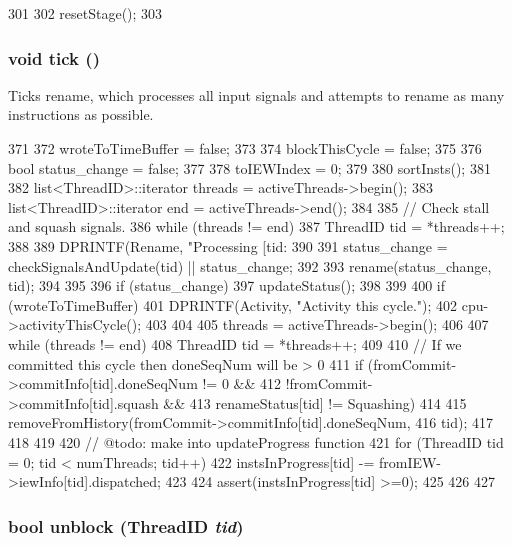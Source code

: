 \begin{DoxyCode}
301 {
302     resetStage();
303 }
\end{DoxyCode}
\hypertarget{classDefaultRename_a873dd91783f9efb4a590aded1f70d6b0}{
\subsubsection[{tick}]{\setlength{\rightskip}{0pt plus 5cm}void tick ()}}
\label{classDefaultRename_a873dd91783f9efb4a590aded1f70d6b0}
Ticks rename, which processes all input signals and attempts to rename as many instructions as possible. 


\begin{DoxyCode}
371 {
372     wroteToTimeBuffer = false;
373 
374     blockThisCycle = false;
375 
376     bool status_change = false;
377 
378     toIEWIndex = 0;
379 
380     sortInsts();
381 
382     list<ThreadID>::iterator threads = activeThreads->begin();
383     list<ThreadID>::iterator end = activeThreads->end();
384 
385     // Check stall and squash signals.
386     while (threads != end) {
387         ThreadID tid = *threads++;
388 
389         DPRINTF(Rename, "Processing [tid:%
390 
391         status_change = checkSignalsAndUpdate(tid) || status_change;
392 
393         rename(status_change, tid);
394     }
395 
396     if (status_change) {
397         updateStatus();
398     }
399 
400     if (wroteToTimeBuffer) {
401         DPRINTF(Activity, "Activity this cycle.\n");
402         cpu->activityThisCycle();
403     }
404 
405     threads = activeThreads->begin();
406 
407     while (threads != end) {
408         ThreadID tid = *threads++;
409 
410         // If we committed this cycle then doneSeqNum will be > 0
411         if (fromCommit->commitInfo[tid].doneSeqNum != 0 &&
412             !fromCommit->commitInfo[tid].squash &&
413             renameStatus[tid] != Squashing) {
414 
415             removeFromHistory(fromCommit->commitInfo[tid].doneSeqNum,
416                                   tid);
417         }
418     }
419 
420     // @todo: make into updateProgress function
421     for (ThreadID tid = 0; tid < numThreads; tid++) {
422         instsInProgress[tid] -= fromIEW->iewInfo[tid].dispatched;
423 
424         assert(instsInProgress[tid] >=0);
425     }
426 
427 }
\end{DoxyCode}
\hypertarget{classDefaultRename_a9cc3b95f6969935f78c0158aa5145021}{
\subsubsection[{unblock}]{\setlength{\rightskip}{0pt plus 5cm}bool unblock ({\bf ThreadID} {\em tid})}}

